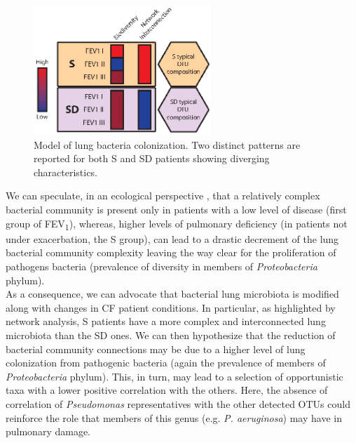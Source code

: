 \begin{figure}[!tb]
	\centering
	\includegraphics[width=0.6\textwidth]{./figures/Chapter_7/Figure_6_16s}
  	\caption{\label{fig:fig616s}Model of lung bacteria colonization. Two distinct patterns are reported for both S and SD patients showing diverging characteristics.}
\end{figure}%
We can speculate, in an ecological perspective \cite{conrad2013cystic}, that a relatively complex bacterial community is present only in patients with a low level of disease (first group of FEV\textsubscript{1}), whereas, higher levels of pulmonary deficiency (in patients not under exacerbation, the S group), can lead to a drastic decrement of the lung bacterial community complexity leaving the way clear for the proliferation of pathogens bacteria (prevalence of diversity in members of  \textit{Proteobacteria} phylum).\\
As a consequence, we can advocate that bacterial lung microbiota is modified along with changes in CF patient conditions. In particular, as highlighted by network analysis, S patients have a more complex and interconnected lung microbiota than the SD ones. We can then hypothesize that the reduction of bacterial community connections may be due to a higher level of lung colonization from pathogenic bacteria (again the prevalence of members of \textit{Proteobacteria} phylum). This, in turn, may lead to a selection of opportunistic taxa with a lower positive correlation with the others. Here, the absence of correlation of \textit{Pseudomonas} representatives with the other detected OTUs could reinforce the role that members of this genus (e.g. \textit{P. aeruginosa}) may have in pulmonary damage.\\

\backmatter
{}
\renewcommand{\sectionmark}[1]{\markright{#1}}
\sectionmark{Bibliography}

